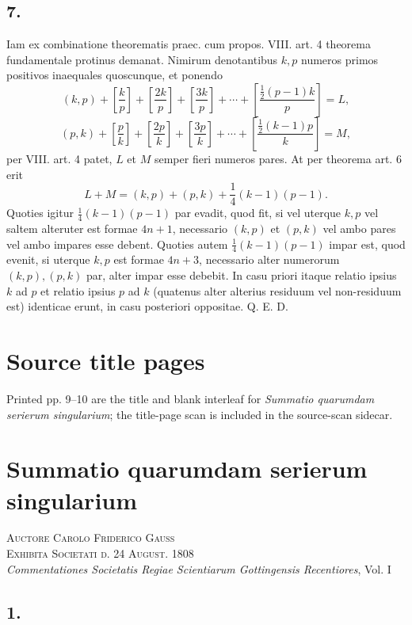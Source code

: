 \documentclass[12pt]{article}
\begin{document}
\subsection*{7.}

Iam ex combinatione theorematis praec. cum propos. VIII. art. 4 theorema fundamentale protinus demanat. Nimirum denotantibus $k,p$ numeros primos positivos inaequales quoscunque, et ponendo
\[
(k,p)+\left[\frac{k}{p}\right]+\left[\frac{2k}{p}\right]+\left[\frac{3k}{p}\right]+\cdots+\left[\frac{\frac12(p-1)k}{p}\right]=L,
\]
\[
(p,k)+\left[\frac{p}{k}\right]+\left[\frac{2p}{k}\right]+\left[\frac{3p}{k}\right]+\cdots+\left[\frac{\frac12(k-1)p}{k}\right]=M,
\]
per VIII. art. 4 patet, $L$ et $M$ semper fieri numeros pares. At per theorema art. 6 erit
\[
L+M=(k,p)+(p,k)+\frac14(k-1)(p-1).
\]
Quoties igitur $\frac14(k-1)(p-1)$ par evadit, quod fit, si vel uterque $k,p$ vel saltem alteruter est formae $4n+1$, necessario $(k,p)$ et $(p,k)$ vel ambo pares vel ambo impares esse debent. Quoties autem $\frac14(k-1)(p-1)$ impar est, quod evenit, si uterque $k,p$ est formae $4n+3$, necessario alter numerorum $(k,p),(p,k)$ par, alter impar esse debebit. In casu priori itaque relatio ipsius $k$ ad $p$ et relatio ipsius $p$ ad $k$ (quatenus alter alterius residuum vel non-residuum est) identicae erunt, in casu posteriori oppositae. Q. E. D.

\clearpage
\section*{Source title pages}
Printed pp. 9--10 are the title and blank interleaf for \emph{Summatio quarumdam serierum singularium}; the title-page scan is included in the source-scan sidecar.


\section*{Summatio quarumdam serierum singularium}

\begin{center}
\textsc{Auctore Carolo Friderico Gauss}\\
\textsc{Exhibita Societati d. 24 August. 1808}\\[3pt]
\emph{Commentationes Societatis Regiae Scientiarum Gottingensis Recentiores}, Vol. I
\end{center}

\subsection*{1.}
\end{document}
